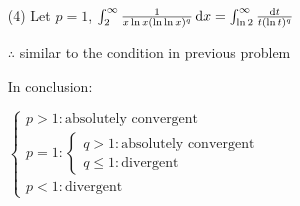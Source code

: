 \begin{enumerate}[1]
\begin{enumerate}[(1)]
     \item[(4)]
     Let $p=1$, $\int_2^{\infty}\frac{1}{x\ln x(\ln \ln x)^q}\dif x=\int_{\ln 2}^{\infty}\frac{\dif t}{t(\ln t)^q}$
     \par $\therefore$ similar to the condition in previous problem
     \par In conclusion: 
     \par $\begin{cases}p>1:\text{absolutely convergent}\\
     p=1:\begin{cases}q>1:\text{absolutely convergent}\\q\leqslant 1:\text{divergent}\end{cases}
     \\p<1:\text{divergent}        \end{cases}$
   \end{enumerate}
 \end{enumerate}

